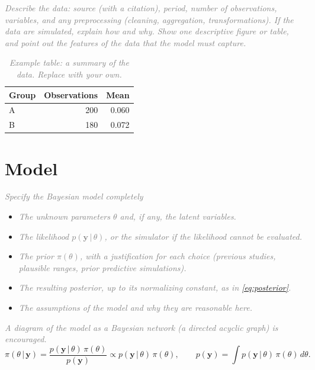 \documentclass[12pt]{article}
\newcommand{\guide}[1]{\textit{\textcolor{gray}{#1}}}
\newcommand{\by}{\mathbf{y}}
\newcommand{\given}{\,\vert\,}
\begin{document}
\guide{Describe the data: source (with a citation), period, number of observations, variables, and any preprocessing (cleaning, aggregation, transformations). If the data are simulated, explain how and why. Show one descriptive figure or table, and point out the features of the data that the model must capture.}

\begin{table}[h]
  \centering
  \caption{\guide{Example table: a summary of the data. Replace with your own.}}
  \label{tab:data}
  \begin{tabular}{@{}lrr@{}}
    \toprule
    Group & Observations & Mean \\
    \midrule
    A & 200 & 0.060 \\
    B & 180 & 0.072 \\
    \bottomrule
  \end{tabular}
\end{table}

\section{Model}\label{sec:model}

\guide{Specify the Bayesian model completely}
\begin{itemize}
  \item \guide{The unknown parameters $\theta$ and, if any, the latent variables.}
  \item \guide{The likelihood $p(\by\given\theta)$, or the simulator if the likelihood cannot be evaluated.}
  \item \guide{The prior $\pi(\theta)$, with a justification for each choice (previous studies, plausible ranges, prior predictive simulations).}
  \item \guide{The resulting posterior, up to its normalizing constant, as in \eqref{eq:posterior}.}
  \item \guide{The assumptions of the model and why they are reasonable here.}
\end{itemize}
\guide{A diagram of the model as a Bayesian network (a directed acyclic graph) is encouraged.}
%
\begin{equation}\label{eq:posterior}
  \pi(\theta\given\by) = \frac{p(\by\given\theta)\,\pi(\theta)}{p(\by)} \propto p(\by\given\theta)\,\pi(\theta),
  \qquad p(\by) = \int p(\by\given\theta)\,\pi(\theta)\,d\theta .
\end{equation}
\end{document}
